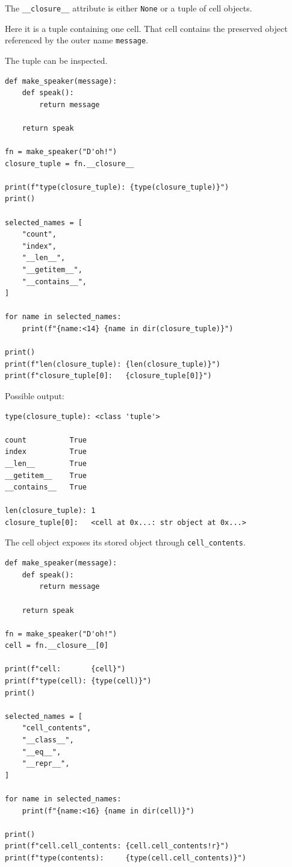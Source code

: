The \texttt{\_\_closure\_\_} attribute is either \texttt{None} or a tuple of cell objects.

Here it is a tuple containing one cell. That cell contains the preserved object referenced by the outer name \texttt{message}.

The tuple can be inspected.

\begin{verbatim}
def make_speaker(message):
    def speak():
        return message

    return speak

fn = make_speaker("D'oh!")
closure_tuple = fn.__closure__

print(f"type(closure_tuple): {type(closure_tuple)}")
print()

selected_names = [
    "count",
    "index",
    "__len__",
    "__getitem__",
    "__contains__",
]

for name in selected_names:
    print(f"{name:<14} {name in dir(closure_tuple)}")

print()
print(f"len(closure_tuple): {len(closure_tuple)}")
print(f"closure_tuple[0]:   {closure_tuple[0]}")
\end{verbatim}

Possible output:

\begin{verbatim}
type(closure_tuple): <class 'tuple'>

count          True
index          True
__len__        True
__getitem__    True
__contains__   True

len(closure_tuple): 1
closure_tuple[0]:   <cell at 0x...: str object at 0x...>
\end{verbatim}

The cell object exposes its stored object through \texttt{cell\_contents}.

\begin{verbatim}
def make_speaker(message):
    def speak():
        return message

    return speak

fn = make_speaker("D'oh!")
cell = fn.__closure__[0]

print(f"cell:       {cell}")
print(f"type(cell): {type(cell)}")
print()

selected_names = [
    "cell_contents",
    "__class__",
    "__eq__",
    "__repr__",
]

for name in selected_names:
    print(f"{name:<16} {name in dir(cell)}")

print()
print(f"cell.cell_contents: {cell.cell_contents!r}")
print(f"type(contents):     {type(cell.cell_contents)}")
\end{verbatim}


